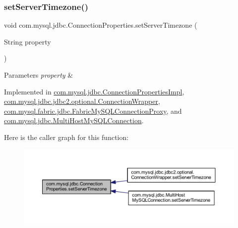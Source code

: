 \subsubsection{\texorpdfstring{set\+Server\+Timezone()}{setServerTimezone()}}
{\footnotesize\ttfamily void com.\+mysql.\+jdbc.\+Connection\+Properties.\+set\+Server\+Timezone (\begin{DoxyParamCaption}\item[{String}]{property }\end{DoxyParamCaption})}


\begin{DoxyParams}{Parameters}
{\em property} & \\
\hline
\end{DoxyParams}


Implemented in \mbox{\hyperlink{classcom_1_1mysql_1_1jdbc_1_1_connection_properties_impl_a41603562941daa36f6b6616896698088}{com.\+mysql.\+jdbc.\+Connection\+Properties\+Impl}}, \mbox{\hyperlink{classcom_1_1mysql_1_1jdbc_1_1jdbc2_1_1optional_1_1_connection_wrapper_a7163560fbf41796601a4d01ef978dd09}{com.\+mysql.\+jdbc.\+jdbc2.\+optional.\+Connection\+Wrapper}}, \mbox{\hyperlink{classcom_1_1mysql_1_1fabric_1_1jdbc_1_1_fabric_my_s_q_l_connection_proxy_a8192c3c5e239f5f1691c61353752dbd5}{com.\+mysql.\+fabric.\+jdbc.\+Fabric\+My\+S\+Q\+L\+Connection\+Proxy}}, and \mbox{\hyperlink{classcom_1_1mysql_1_1jdbc_1_1_multi_host_my_s_q_l_connection_a49872e46bc69088b63f84767c386e811}{com.\+mysql.\+jdbc.\+Multi\+Host\+My\+S\+Q\+L\+Connection}}.

Here is the caller graph for this function\+:\nopagebreak
\begin{figure}[H]
\begin{center}
\leavevmode
\includegraphics[width=350pt]{interfacecom_1_1mysql_1_1jdbc_1_1_connection_properties_a696230dd8e57568c8742fffecb1040aa_icgraph}
\end{center}
\end{figure}
\mbox{\label{interfacecom_1_1mysql_1_1jdbc_1_1_connection_properties_a9883494dfd2b4b2ed6905ecc13cc167d}} 
